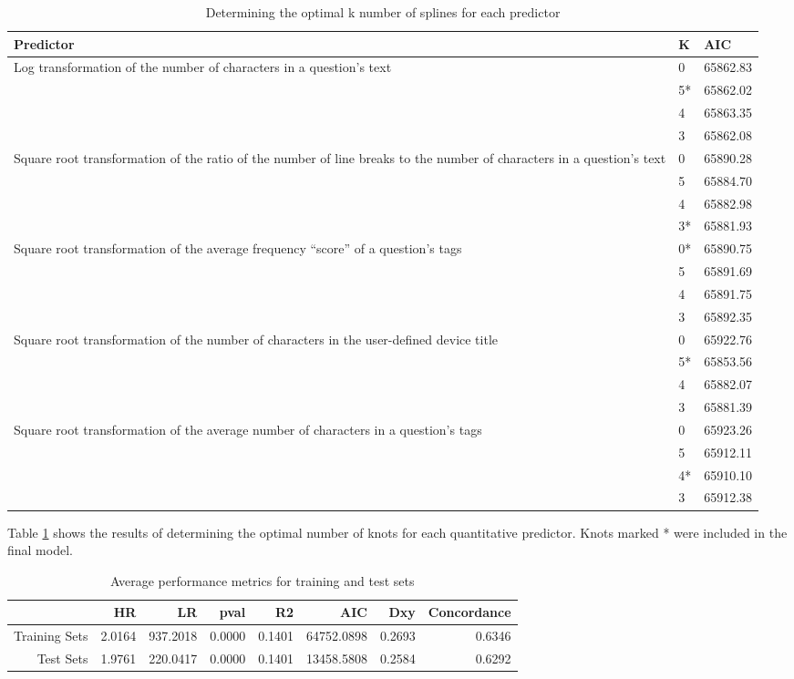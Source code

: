 \documentclass{article}
\begin{document}
\begin{table}[ht]
\centering
\caption{Determining the optimal k number of splines for each predictor} 
\begin{tabular}{| p{5cm} | l | l |}
  \hline
  Predictor & K & AIC \\ 
  \hline
  \multirow{ 4 }{ 5cm }{Log transformation of the number of characters in a question's text} 
  & 0 & 65862.83 \\ 
  & 5* & 65862.02 \\ 
  & 4 & 65863.35 \\ 
  & 3 & 65862.08 \\ 
  \hline
  \multirow{ 4 }{ 5 cm }{Square root transformation of the ratio of the number of line breaks to the number of characters in a question's text}
  & 0 & 65890.28 \\ 
  & 5 & 65884.70 \\ 
  & 4 & 65882.98 \\ 
  & 3* & 65881.93 \\ 
  \hline
  \multirow{ 4 }{ 5 cm }{Square root transformation of the average frequency ``score'' of a question's tags}
  & 0* & 65890.75 \\ 
  & 5 & 65891.69 \\ 
  & 4 & 65891.75 \\ 
  & 3 & 65892.35 \\ 
  \hline
  \multirow{ 4 }{ 5 cm }{Square root transformation of the number of characters in the user-defined device title}
  & 0 & 65922.76 \\ 
  & 5* & 65853.56 \\ 
  & 4 & 65882.07 \\ 
  & 3 & 65881.39 \\ 
  \hline
  \multirow{ 4 }{ 5 cm }{Square root transformation of the average number of characters in a question's tags}
  & 0 & 65923.26 \\ 
  & 5 & 65912.11 \\ 
  & 4* & 65910.10 \\ 
  & 3 & 65912.38 \\ 
   \hline
\end{tabular}
\label{table:splines}
\end{table}

Table \ref{table:splines} shows the results of determining the optimal number of knots for each quantitative predictor. Knots marked * were included in the final model. 

\begin{table}[ht]
\centering
\caption{Average performance metrics for training and test sets} 
\begin{tabular}{rrrrrrrr}
  \hline
 & HR & LR & pval & R2 & AIC & Dxy & Concordance \\ 
  \hline
  Training Sets & 2.0164 & 937.2018 & 0.0000 & 0.1401 & 64752.0898 & 0.2693 & 0.6346 \\ 
  Test Sets & 1.9761 & 220.0417 & 0.0000 & 0.1401 & 13458.5808 & 0.2584 & 0.6292 \\
   \hline
\end{tabular}
\label{table:cv}
\end{table}
\end{document}
